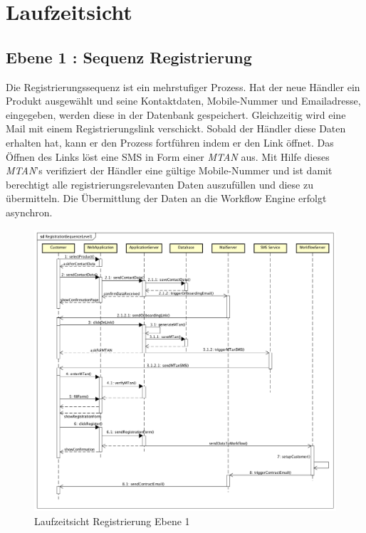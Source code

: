 \graphicspath{{./images/}}

\chapter{Laufzeitsicht}

\section{Ebene 1 : Sequenz Registrierung}

Die Registrierungssequenz ist ein mehrstufiger Prozess. Hat der neue Händler ein Produkt ausgewählt und seine Kontaktdaten, Mobile-Nummer und Emailadresse, eingegeben, werden diese in der Datenbank gespeichert. Gleichzeitig wird eine Mail mit einem Registrierungslink verschickt. Sobald der Händler diese Daten erhalten hat, kann er den Prozess fortführen indem er den Link öffnet. Das Öffnen des Links löst eine SMS in Form einer \textit{\gls{MTAN}} aus. Mit Hilfe dieses \textit{\gls{MTAN}}'s verifiziert der Händler eine gültige Mobile-Nummer und ist damit berechtigt alle registrierungsrelevanten Daten auszufüllen und diese zu übermitteln. Die Übermittlung der Daten an die Workflow Engine erfolgt asynchron.
\begin{figure}[H]
	\centering
	\includegraphics[scale=0.44]{RegistrationSequenceLevel1.png}
	\caption{Laufzeitsicht Registrierung Ebene 1}
\end{figure}
\newpage

